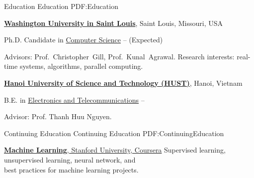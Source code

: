 \documentclass[letterpaper,MMMyyyy,nonstopmode]{simpleresumecv}
\begin{document}
\begin{Body}


\Section
{Education}
{Education}
{PDF:Education}

\Entry
\href{https://wustl.edu}
{\textbf{Washington University in Saint Louis}},
Saint Louis, Missouri, USA

\Gap
\BulletItem
Ph.D. Candidate in
\href{https://cse.wustl.edu/Pages/default.aspx}
{Computer Science}
\hfill
{} --  (Expected)
\begin{Detail}
\SubBulletItem
Advisors:
Prof.~Christopher~Gill, Prof.~Kunal~Agrawal.
\SubBulletItem
Research interests: real-time systems, algorithms, parallel computing.
\end{Detail}



\BigGap
\Entry
\href{https://en.hust.edu.vn/home}
{\textbf{Hanoi University of Science and Technology (HUST)}},
Hanoi, Vietnam

\Gap
\BulletItem
B.E. in
\href{http://set.hust.edu.vn/index.php/en}
{Electronics and Telecommunications}
\hfill
{} --
\begin{Detail}
\SubBulletItem
Advisor: Prof. Thanh Huu Nguyen.
\end{Detail}


\Section
{Continuing Education}
{Continuing Education}
{PDF:ContinuingEducation}

\Entry
\href{https://www.coursera.org/account/accomplishments/certificate/HZCT9RFV84YS}
{\textbf{Machine Learning}, Stanford University, Coursera}
\hfill {}
\BulletItem
Supervised learning, unsupervised learning, neural network, and \\
best practices for machine learning projects.


\end{Body}
\end{document}
